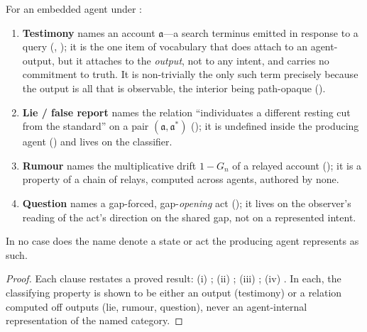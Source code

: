 \documentclass[11pt,twocolumn,a4paper]{article}
\newcommand{\acct}{\mathfrak{a}}   %
\begin{document}
\begin{theorem}
\label{thm:locus}
For an embedded agent under :
\begin{enumerate}[label=\textup{(\roman*)},leftmargin=2.2em]
\item \textbf{Testimony} names an account $\acct$---a search terminus
emitted in response to a query (, );
it is the one item of vocabulary that does attach to an agent-output, but it
attaches to the \emph{output}, not to any intent, and carries no commitment
to truth. It is non-trivially the only such term precisely because the
output is all that is observable, the interior being path-opaque
().
\item \textbf{Lie / false report} names the relation ``individuates a
different resting cut from the standard'' on a pair $(\acct,\acct^\ast)$
(); it is undefined inside the producing agent
() and lives on the classifier.
\item \textbf{Rumour} names the multiplicative drift $1-G_n$ of a relayed
account (); it is a property of a chain of
relays, computed across agents, authored by none.
\item \textbf{Question} names a gap-forced, gap-\emph{opening} act
(); it lives on the
observer's reading of the act's direction on the shared gap, not on a
represented intent.
\end{enumerate}
In no case does the name denote a state or act the producing agent
represents as such.
\end{theorem}

\begin{proof}
Each clause restates a proved result: (i) ;
(ii) ; (iii)
; (iv)
. In each, the classifying
property is shown to be either an output (testimony) or a relation computed
off outputs (lie, rumour, question), never an agent-internal representation
of the named category.
\end{proof}
\end{document}
